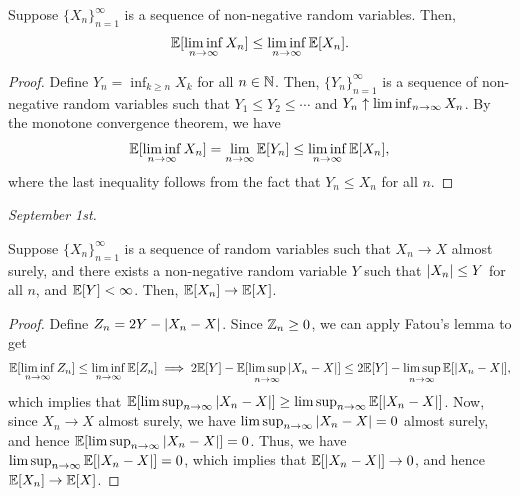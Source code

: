 \begin{lemma}
    Suppose $\{X_{n}\}_{n=1}^{\infty}$ is a sequence of non-negative random variables. Then,
    \begin{align}
        \mathbb{E}[\liminf_{n \to \infty} X_{n}] \leq \liminf_{n \to \infty} \mathbb{E}[X_{n}].
    \end{align}
\end{lemma}

\begin{proof}
    Define $Y_{n} = \inf_{k \geq n} X_{k}$ for all $n \in \mathbb{N}$. Then, $\{Y_{n}\}_{n=1}^{\infty}$ is a sequence of non-negative random variables such that $Y_{1} \leq Y_{2} \leq \cdots$ and $Y_{n} \uparrow \liminf_{n \to \infty} X_{n}$. By the monotone convergence theorem, we have
    \begin{align}
        \mathbb{E}[\liminf_{n \to \infty} X_{n}] = \lim_{n \to \infty} \mathbb{E}[Y_{n}] \leq \liminf_{n \to \infty} \mathbb{E}[X_{n}],
    \end{align}
    where the last inequality follows from the fact that $Y_{n} \leq X_{n}$ for all $n$.
\end{proof}

\textit{September 1st.}

\begin{theorem}
    Suppose $\{X_{n}\}_{n=1}^{\infty}$ is a sequence of random variables such that $X_{n} \to X$ almost surely, and there exists a non-negative random variable $Y$ such that $\left| X_{n} \right| \leq Y$ for all $n$, and $\mathbb{E}[Y] < \infty$. Then, $\mathbb{E}[X_{n}] \to \mathbb{E}[X]$.
\end{theorem}
\begin{proof}
    Define $Z_{n} = 2Y - \left| X_{n}-X \right|$. Since $\mathbb{Z}_{n} \geq 0$, we can apply Fatou's lemma to get
    \begin{align}
        \mathbb{E}[\liminf_{n \to \infty} Z_{n}] \leq \liminf_{n \to \infty} \mathbb{E}[Z_{n}] \implies 2\mathbb{E}[Y] - \mathbb{E}[\limsup_{n \to \infty} \left| X_{n}-X \right|] \leq 2\mathbb{E}[Y] - \limsup_{n \to \infty} \mathbb{E}[\left| X_{n}-X \right|],
    \end{align}
    which implies that $\mathbb{E}[\limsup_{n \to \infty} \left| X_{n}-X \right|] \geq \limsup_{n \to \infty} \mathbb{E}[\left| X_{n}-X \right|]$. Now, since $X_{n} \to X$ almost surely, we have $\limsup_{n \to \infty} \left| X_{n}-X \right| = 0$ almost surely, and hence $\mathbb{E}[\limsup_{n \to \infty} \left| X_{n}-X \right|] = 0$. Thus, we have $\limsup_{n \to \infty} \mathbb{E}[\left| X_{n}-X \right|] = 0$, which implies that $\mathbb{E}[\left| X_{n}-X \right|] \to 0$, and hence $\mathbb{E}[X_{n}] \to \mathbb{E}[X]$.
\end{proof}